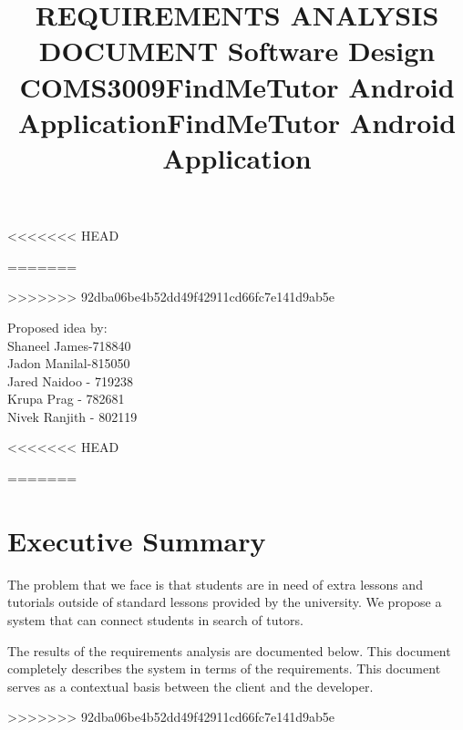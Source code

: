 \documentclass[12pt]{article}
\begin{document}
\title{\textbf{REQUIREMENTS ANALYSIS DOCUMENT }}
\maketitle

\begin{center}
\title{\textbf{Software Design COMS3009}}
<<<<<<< HEAD
\maketitle 
\end{center}
\begin{center}
\title{\textbf{FindMeTutor Android Application}}
\maketitle 
=======
\maketitle
\end{center}
\begin{center}
\title{\textbf{FindMeTutor Android Application}}
\maketitle
>>>>>>> 92dba06be4b52dd49f42911cd66fc7e141d9ab5e
\end{center}

\begin{center}
Proposed idea by:\\
Shaneel James-718840
\\Jadon Manilal-815050
\\Jared Naidoo - 719238
\\Krupa Prag - 782681
\\Nivek Ranjith - 802119
\end{center}

<<<<<<< HEAD
\newpage

\tableofcontents
\newpage
=======

\newpage
\tableofcontents
\newpage


\section{\textbf{Executive Summary}}
\begin{flushleft}
The problem that we face is that students are in need of extra lessons and tutorials outside of standard lessons provided by the university. We propose a system that can connect students in search of tutors.

The results of the requirements analysis are documented below. This document completely describes the system in terms of the requirements. This document serves as a contextual basis between the client and the developer.
\end{flushleft}
\newpage
>>>>>>> 92dba06be4b52dd49f42911cd66fc7e141d9ab5e
\end{document}
